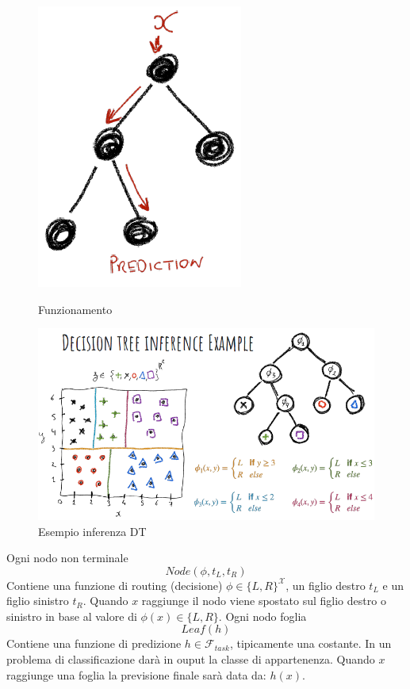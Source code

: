 \begin{figure}
	\centering
	\begin{minipage}{.3\textwidth}
		\centering
		\includegraphics[width=0.7\linewidth]{imgs/chapter5/img0}
		\caption{Funzionamento}
		\label{fig:chapter05-00}
	\end{minipage}%
	\begin{minipage}{.7\textwidth}
		\centering
		\includegraphics[width=1\linewidth]{imgs/chapter5/img1}
		\caption{Esempio inferenza DT}
		\label{fig:chapter05-01}
	\end{minipage}
\end{figure}

Ogni nodo non terminale
$$Node(\phi, t_L, t_R)$$
Contiene una funzione di routing (decisione) $\phi\in\{L, R\}^{\mathcal{X}}$, un figlio destro $t_L$ e un figlio sinistro $t_R$.
Quando $x$ raggiunge il nodo viene spostato sul figlio destro o sinistro in base al valore di $\phi(x)\in\{L,R\}$.
Ogni nodo foglia
$$Leaf(h)$$
Contiene una funzione di predizione $h\in\mathcal{F}_{task}$, tipicamente una costante. In un problema di classificazione dar\`a in ouput la classe di appartenenza. 
Quando $x$ raggiunge una foglia la previsione finale sar\`a data da: $h(x)$.

